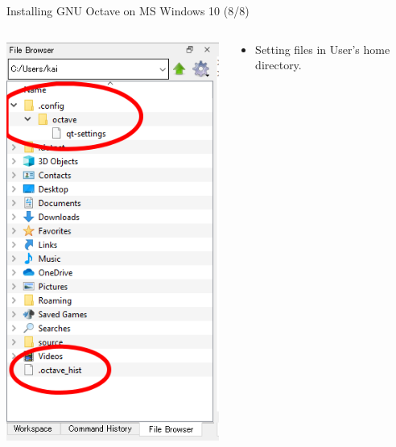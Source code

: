 \begin{frame}{Installing GNU Octave on MS Windows 10 (8/8)}
\begin{columns}
\begin{column}{0.3\textwidth}
\includegraphics[width=\textwidth]{res/ms_windows/win_octave_settings.png}
\end{column}
\begin{column}{0.6\textwidth}
\begin{itemize}
\itemsep2em
\item
Setting files in User's home directory.


\end{itemize}
\end{column}
\end{columns}
\end{frame}
